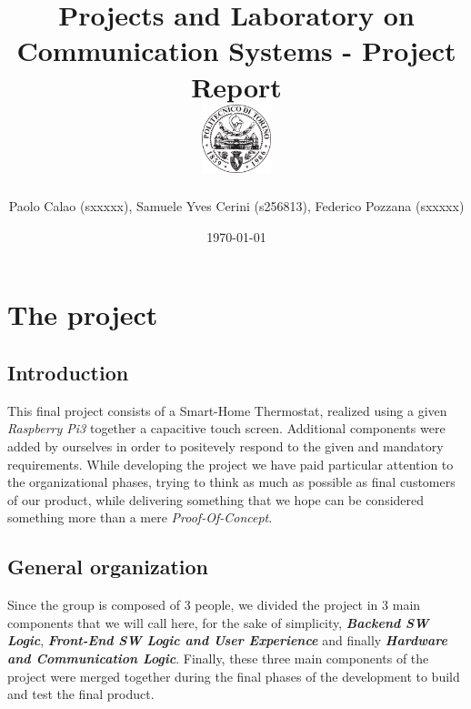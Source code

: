 \documentclass[a4paper]{article}
\begin{document}
    \title{
        Projects and Laboratory on Communication Systems - Project Report \\[0.5cm]
        \includegraphics[width=0.15\textwidth]{PoliLogo.png}%
    }
    \author{Paolo Calao (sxxxxx), Samuele Yves Cerini (s256813), Federico Pozzana (sxxxxx)}

    \date{\today}
    \maketitle
    
    
    \tableofcontents    
    
    \section{The project}

        \subsection{Introduction}
        This final project consists of a Smart-Home Thermostat, realized using a given \emph{Raspberry Pi3} together a capacitive touch screen.
        Additional components were added by ourselves in order to positevely respond to the given and mandatory requirements.
        While developing the project we have paid particular attention to the organizational phases, trying to think as much as possible as final customers of our product, while delivering something that we hope can be considered something more than a mere \emph{Proof-Of-Concept}.
            
        \subsection{General organization}
        Since the group is composed of 3 people, we divided the project in 3 main components that we will call here, for the sake of simplicity, \textbf{\emph{Backend SW Logic}}, \textbf{\emph{Front-End SW Logic and User Experience}} and finally \textbf{\emph{Hardware and Communication Logic}}.
        Finally, these three main components of the project were merged together during the final phases of the development to build and test the final product.
\end{document}
